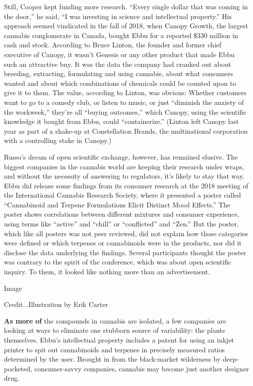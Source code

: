 Still, Cooper kept funding more research. ``Every single dollar that was
coming in the door,'' he said, ``I was investing in science and
intellectual property.'' His approach seemed vindicated in the fall of
2018, when Canopy Growth, the largest cannabis conglomerate in Canada,
bought Ebbu for a reported \$330 million in cash and stock. According to
Bruce Linton, the founder and former chief executive of Canopy, it
wasn't Genesis or any other product that made Ebbu such an attractive
buy. It was the data the company had cranked out about breeding,
extracting, formulating and using cannabis, about what consumers wanted
and about which combinations of chemicals could be counted upon to give
it to them. The value, according to Linton, was obvious: Whether
customers want to go to a comedy club, or listen to music, or just
``diminish the anxiety of the workweek,'' they're all ``buying
outcomes,'' which Canopy, using the scientific knowledge it bought from
Ebbu, could ``containerize.'' (Linton left Canopy last year as part of a
shake-up at Constellation Brands, the multinational corporation with a
controlling stake in Canopy.)

Russo's dream of open scientific exchange, however, has remained
elusive. The biggest companies in the cannabis world are keeping their
research under wraps, and without the necessity of answering to
regulators, it's likely to stay that way. Ebbu did release some findings
from its consumer research at the 2018 meeting of the International
Cannabis Research Society, where it presented a poster called
``Cannabinoid and Terpene Formulations Elicit Distinct Mood Effects.''
The poster shows correlations between different mixtures and consumer
experience, using terms like ``active'' and ``chill'' or ``conflicted''
and ``Zen.'' But the poster, which like all posters was not peer
reviewed, did not explain how those categories were defined or which
terpenes or cannabinoids were in the products, nor did it disclose the
data underlying the findings. Several participants thought the poster
was contrary to the spirit of the conference, which was about open
scientific inquiry. To them, it looked like nothing more than an
advertisement.

Image

Credit...Illustration by Erik Carter

\textbf{As more of} the compounds in cannabis are isolated, a few
companies are looking at ways to eliminate one stubborn source of
variability: the plants themselves. Ebbu's intellectual property
includes a patent for using an inkjet printer to spit out cannabinoids
and terpenes in precisely measured ratios determined by the user.
Brought in from the black-market wilderness by deep-pocketed,
consumer-savvy companies, cannabis may become just another designer
drug.

